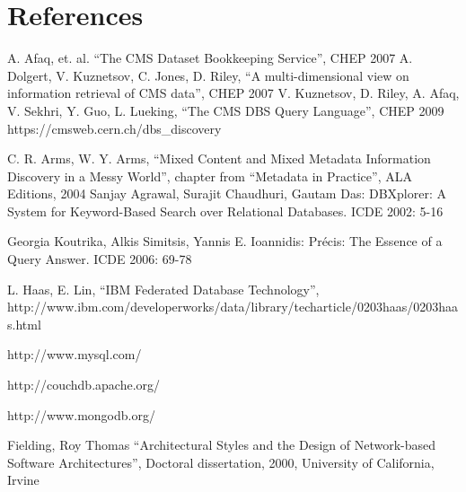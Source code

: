 \documentclass[a4paper]{jpconf}
\begin{document}
\section*{References}
\begin{thebibliography}{9}
 A. Afaq, et. al. ``The CMS Dataset Bookkeeping Service'', CHEP 2007 
 A. Dolgert, V. Kuznetsov, C. Jones, D. Riley, 
``A multi-dimensional view on information retrieval of CMS data'', CHEP 2007
 V. Kuznetsov, D. Riley, A. Afaq, V. Sekhri, Y. Guo, L. Lueking,
``The CMS DBS Query Language'', CHEP 2009
 https://cmsweb.cern.ch/dbs\_discovery

C. R. Arms, W. Y. Arms, ``Mixed Content and Mixed Metadata 
Information Discovery in a Messy World'',
chapter from ``Metadata in Practice'', ALA Editions, 2004
Sanjay Agrawal, Surajit Chaudhuri, Gautam Das: DBXplorer: A System for
Keyword-Based Search over Relational Databases. ICDE 2002: 5-16

Georgia Koutrika, Alkis Simitsis, Yannis E. Ioannidis: Pr\'{e}cis: The Essence of
a Query Answer. ICDE 2006: 69-78

L. Haas, E. Lin,
``IBM Federated Database Technology'', \\
http://www.ibm.com/developerworks/data/library/techarticle/0203haas/0203haas.html

http://www.mysql.com/

http://couchdb.apache.org/

http://www.mongodb.org/

Fielding, Roy Thomas ``Architectural Styles and the Design of 
Network-based Software Architectures'', Doctoral dissertation, 2000,
University of California, Irvine

\end{thebibliography}
\end{document}
